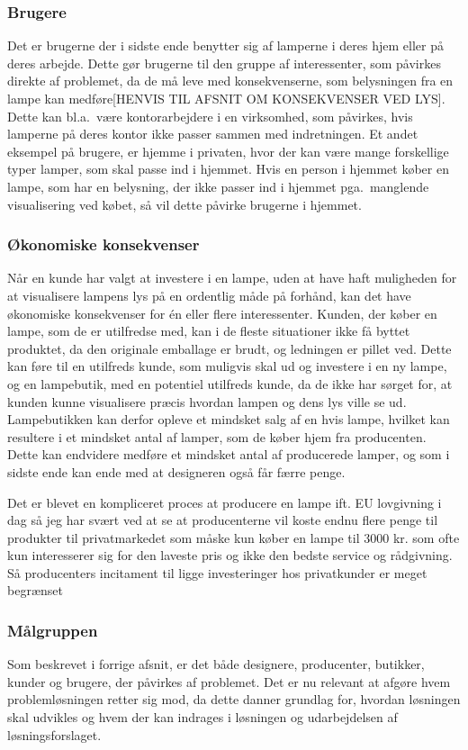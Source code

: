 \subsubsection{Brugere}
Det er brugerne der i sidste ende benytter sig af lamperne i deres hjem eller på deres arbejde. Dette gør brugerne til den gruppe af interessenter, som påvirkes direkte af problemet, da de må leve med konsekvenserne, som belysningen fra en lampe kan medføre[HENVIS TIL AFSNIT OM KONSEKVENSER VED LYS]. Dette kan bl.a.\ være kontorarbejdere i en virksomhed, som påvirkes, hvis lamperne på deres kontor ikke passer sammen med indretningen. Et andet eksempel på brugere, er hjemme i privaten, hvor der kan være mange forskellige typer lamper, som skal passe ind i hjemmet. Hvis en person i hjemmet køber en lampe, som har en belysning, der ikke passer ind i hjemmet pga.\ manglende visualisering ved købet, så vil dette påvirke brugerne i hjemmet. 

\subsubsection{Økonomiske konsekvenser}
Når en kunde har valgt at investere i en lampe, uden at have haft muligheden for at visualisere lampens lys på en ordentlig måde på forhånd, kan det have økonomiske konsekvenser for én eller flere interessenter. Kunden, der køber en lampe, som de er utilfredse med, kan i de fleste situationer ikke få byttet produktet, da den originale emballage er brudt, og ledningen er pillet ved. Dette kan føre til en utilfreds kunde, som muligvis skal ud og investere i en ny lampe, og en lampebutik, med en potentiel utilfreds kunde, da de ikke har sørget for, at kunden kunne visualisere præcis hvordan lampen og dens lys ville se ud. Lampebutikken kan derfor opleve et mindsket salg af en hvis lampe, hvilket kan resultere i et mindsket antal af lamper, som de køber hjem fra producenten. Dette kan endvidere medføre et mindsket antal af producerede lamper, og som i sidste ende kan ende med at designeren også får færre penge.


Det er blevet en kompliceret proces at producere en lampe ift. EU lovgivning i dag så jeg har svært ved at se at producenterne vil koste endnu flere penge til produkter til privatmarkedet som måske kun køber en lampe til 3000 kr. som ofte kun interesserer sig for den laveste pris og ikke den bedste service og rådgivning. Så producenters incitament til ligge investeringer hos privatkunder er meget begrænset

\subsubsection{Målgruppen}
Som beskrevet i forrige afsnit, er det både designere, producenter, butikker, kunder og brugere, der påvirkes af problemet. Det er nu relevant at afgøre hvem problemløsningen retter sig mod, da dette danner grundlag for, hvordan løsningen skal udvikles og hvem der kan indrages i løsningen og udarbejdelsen af løsningsforslaget.

